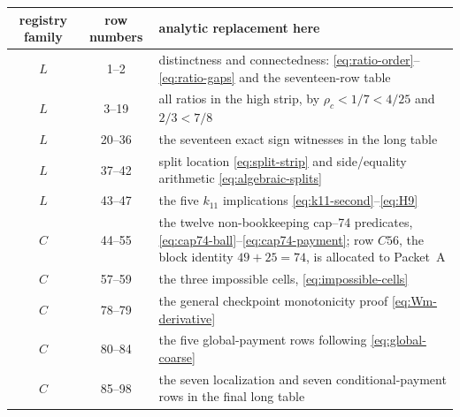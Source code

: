\documentclass[11pt]{article}
\begin{document}
\begin{center}
\small
\renewcommand{\arraystretch}{1.16}
\begin{tabular}{@{}c c L{12.1cm}@{}}
\toprule
registry family&row numbers&analytic replacement here\\
\midrule
\(L\)&1--2&distinctness and connectedness:
\eqref{eq:ratio-order}--\eqref{eq:ratio-gaps} and the seventeen-row table\\
\(L\)&3--19&all ratios in the high strip, by
\(\rho_c<1/7<4/25\) and \(2/3<7/8\)\\
\(L\)&20--36&the seventeen exact sign witnesses in
the long table\\
\(L\)&37--42&split location
\eqref{eq:split-strip} and side/equality arithmetic
\eqref{eq:algebraic-splits}\\
\(L\)&43--47&the five \(k_{11}\) implications
\eqref{eq:k11-second}--\eqref{eq:H9}\\
\(C\)&44--55&the twelve non-bookkeeping cap--74
predicates, \eqref{eq:cap74-ball}--\eqref{eq:cap74-payment};
row \(C56\), the block identity \(49+25=74\), is allocated to Packet~A\\
\(C\)&57--59&the three impossible
cells, \eqref{eq:impossible-cells}\\
\(C\)&78--79&the general checkpoint
monotonicity proof \eqref{eq:Wm-derivative}\\
\(C\)&80--84&the five global-payment
rows following \eqref{eq:global-coarse}\\
\(C\)&85--98&the seven localization
and seven conditional-payment rows in the final long table\\
\bottomrule
\end{tabular}
\end{center}
\end{document}
